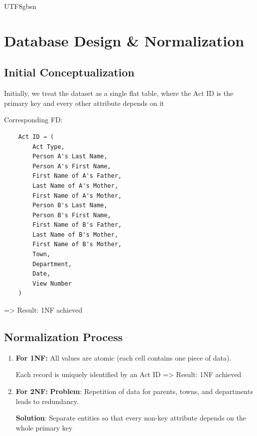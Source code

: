 \documentclass[11pt]{report}
\begin{document}
\begin{CJK*}{UTF8}{gbsn}
    \section{Database Design \& Normalization}

    \subsection{Initial Conceptualization}

    Initially, we treat the dataset as a single flat table, where the Act ID is the primary key and every other attribute depends on it

    Corresponding FD:
    \begin{verbatim}
    Act ID → (
        Act Type,
        Person A's Last Name,
        Person A's First Name,
        First Name of A's Father,
        Last Name of A's Mother,
        First Name of A's Mother,
        Person B's Last Name,
        Person B's First Name,
        First Name of B's Father,
        Last Name of B's Mother,
        First Name of B's Mother,
        Town,
        Department,
        Date,
        View Number
    )
    \end{verbatim}

    => Result: 1NF achieved

    \subsection{Normalization Process}

    \begin{enumerate}
        \item \textbf{For 1NF:}\newline
              All values are atomic (each cell contains one piece of data).

              Each record is uniquely identified by an Act ID
              => Result: 1NF achieved

        \item \textbf{For 2NF:} \newline
              \textbf{Problem}: Repetition of data for parents, towns, and departments leads to redundancy.

              \textbf{Solution}: Separate entities so that every non-key attribute depends on the whole primary key


\end{enumerate}
\end{CJK*}
\end{document}
